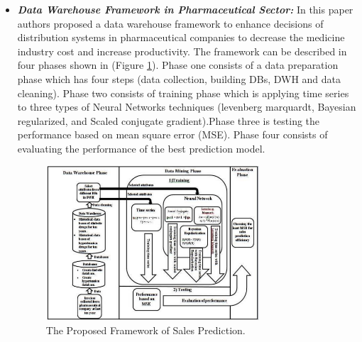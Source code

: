 \begin{itemize}
    \item \textbf{\textit{Data Warehouse Framework in Pharmaceutical Sector:}} In this paper\cite{abd2019proposed} authors proposed a data warehouse framework to enhance decisions of distribution systems in pharmaceutical companies to decrease the medicine industry cost and increase productivity. The framework can be described in four phases shown in (Figure \ref{fig:pharmacysystem}). Phase one consists of a data preparation phase which has four steps (data collection, building DBs, DWH and data cleaning). Phase two consists of training phase which is applying time series to three types of Neural Networks techniques (levenberg marquardt, Bayesian regularized, and Scaled conjugate gradient).Phase three is testing the performance based on mean square error (MSE). Phase four consists of evaluating the performance of the best prediction model.
    \begin{figure}[h!]
      \center
      \includegraphics[width=0.75\textwidth]{images/chapter2/pharmacysystem.PNG}
      \caption{The Proposed Framework of Sales Prediction.}
      \label{fig:pharmacysystem}
    \end{figure}
    

\end{itemize}
